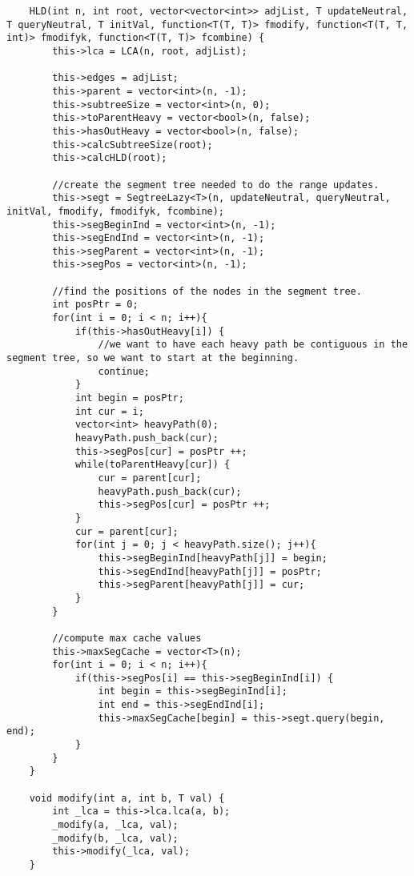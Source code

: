 \documentclass[8pt, headheight=10pt, a4paper]{article}
\begin{document}
\begin{multicols*}{3}
\begin{lstlisting}
    HLD(int n, int root, vector<vector<int>> adjList, T updateNeutral, T queryNeutral, T initVal, function<T(T, T)> fmodify, function<T(T, T, int)> fmodifyk, function<T(T, T)> fcombine) {
        this->lca = LCA(n, root, adjList);
        
        this->edges = adjList;
        this->parent = vector<int>(n, -1);
        this->subtreeSize = vector<int>(n, 0);
        this->toParentHeavy = vector<bool>(n, false);
        this->hasOutHeavy = vector<bool>(n, false);
        this->calcSubtreeSize(root);
        this->calcHLD(root);

        //create the segment tree needed to do the range updates. 
        this->segt = SegtreeLazy<T>(n, updateNeutral, queryNeutral, initVal, fmodify, fmodifyk, fcombine);
        this->segBeginInd = vector<int>(n, -1);
        this->segEndInd = vector<int>(n, -1);
        this->segParent = vector<int>(n, -1);
        this->segPos = vector<int>(n, -1);

        //find the positions of the nodes in the segment tree. 
        int posPtr = 0;
        for(int i = 0; i < n; i++){
            if(this->hasOutHeavy[i]) {
                //we want to have each heavy path be contiguous in the segment tree, so we want to start at the beginning. 
                continue;
            }
            int begin = posPtr;
            int cur = i;
            vector<int> heavyPath(0);
            heavyPath.push_back(cur);
            this->segPos[cur] = posPtr ++;
            while(toParentHeavy[cur]) {
                cur = parent[cur];
                heavyPath.push_back(cur);
                this->segPos[cur] = posPtr ++;
            }
            cur = parent[cur];
            for(int j = 0; j < heavyPath.size(); j++){
                this->segBeginInd[heavyPath[j]] = begin;
                this->segEndInd[heavyPath[j]] = posPtr;
                this->segParent[heavyPath[j]] = cur;
            }
        }

        //compute max cache values
        this->maxSegCache = vector<T>(n);
        for(int i = 0; i < n; i++){
            if(this->segPos[i] == this->segBeginInd[i]) {
                int begin = this->segBeginInd[i];
                int end = this->segEndInd[i];
                this->maxSegCache[begin] = this->segt.query(begin, end);
            }
        }
    }

    void modify(int a, int b, T val) {
        int _lca = this->lca.lca(a, b);
        _modify(a, _lca, val);
        _modify(b, _lca, val);
        this->modify(_lca, val);
    }


\end{lstlisting}
\end{multicols*}
\end{document}

